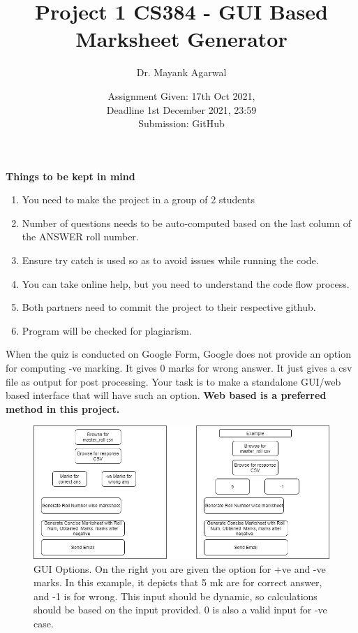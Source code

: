 \documentclass{article}
\title{Project 1 CS384 -   GUI Based Marksheet Generator}
\author{Dr. Mayank Agarwal}
\date{Assignment Given: 17th Oct 2021,\\ Deadline 1st December 2021,  
23:59\\Submission: GitHub }
\begin{document}
	\maketitle  
	\textbf{Things to be kept in mind} 
	\begin{enumerate}
\item You need to make the project in a group of 2 students
\item Number of questions needs to be auto-computed based on the last 
column of the ANSWER roll number. 	

\item Ensure try catch is used so as to avoid issues while running the code. 

\item You can take online help, but you need to understand the code flow 
process.

\item Both partners need to commit the project to their respective github. 
\item Program will be checked for plagiarism.   
\end{enumerate}

When the quiz is conducted on Google Form, Google does not provide an option 
for computing -ve marking. It gives 0 marks for wrong answer. It just gives a 
csv file as output for post 
processing. Your task is to make a standalone GUI/web based interface that will 
have such an option. \textbf{Web based is a preferred method in this project. }

\begin{figure}
	\centering
	\includegraphics[width=0.99\linewidth]{Python_Project.png}
	\caption{GUI Options. On the right you are given the option for +ve and -ve 
	marks. In this example, it depicts that 5 mk are for correct answer, and -1 
	is for wrong. This input  should be dynamic, so calculations should be 
	based on the input provided. 0 is also a valid input for -ve case.}
	\label{fig:marksheet_project}
\end{figure}
\end{document}
